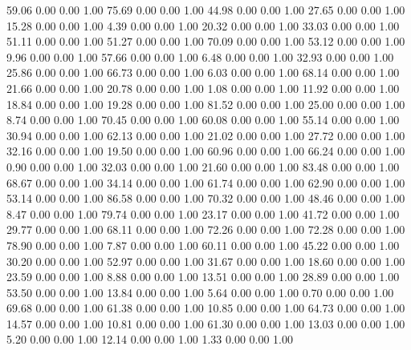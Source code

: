    59.06   0.00   0.00   1.00
   75.69   0.00   0.00   1.00
   44.98   0.00   0.00   1.00
   27.65   0.00   0.00   1.00
   15.28   0.00   0.00   1.00
    4.39   0.00   0.00   1.00
   20.32   0.00   0.00   1.00
   33.03   0.00   0.00   1.00
   51.11   0.00   0.00   1.00
   51.27   0.00   0.00   1.00
   70.09   0.00   0.00   1.00
   53.12   0.00   0.00   1.00
    9.96   0.00   0.00   1.00
   57.66   0.00   0.00   1.00
    6.48   0.00   0.00   1.00
   32.93   0.00   0.00   1.00
   25.86   0.00   0.00   1.00
   66.73   0.00   0.00   1.00
    6.03   0.00   0.00   1.00
   68.14   0.00   0.00   1.00
   21.66   0.00   0.00   1.00
   20.78   0.00   0.00   1.00
    1.08   0.00   0.00   1.00
   11.92   0.00   0.00   1.00
   18.84   0.00   0.00   1.00
   19.28   0.00   0.00   1.00
   81.52   0.00   0.00   1.00
   25.00   0.00   0.00   1.00
    8.74   0.00   0.00   1.00
   70.45   0.00   0.00   1.00
   60.08   0.00   0.00   1.00
   55.14   0.00   0.00   1.00
   30.94   0.00   0.00   1.00
   62.13   0.00   0.00   1.00
   21.02   0.00   0.00   1.00
   27.72   0.00   0.00   1.00
   32.16   0.00   0.00   1.00
   19.50   0.00   0.00   1.00
   60.96   0.00   0.00   1.00
   66.24   0.00   0.00   1.00
    0.90   0.00   0.00   1.00
   32.03   0.00   0.00   1.00
   21.60   0.00   0.00   1.00
   83.48   0.00   0.00   1.00
   68.67   0.00   0.00   1.00
   34.14   0.00   0.00   1.00
   61.74   0.00   0.00   1.00
   62.90   0.00   0.00   1.00
   53.14   0.00   0.00   1.00
   86.58   0.00   0.00   1.00
   70.32   0.00   0.00   1.00
   48.46   0.00   0.00   1.00
    8.47   0.00   0.00   1.00
   79.74   0.00   0.00   1.00
   23.17   0.00   0.00   1.00
   41.72   0.00   0.00   1.00
   29.77   0.00   0.00   1.00
   68.11   0.00   0.00   1.00
   72.26   0.00   0.00   1.00
   72.28   0.00   0.00   1.00
   78.90   0.00   0.00   1.00
    7.87   0.00   0.00   1.00
   60.11   0.00   0.00   1.00
   45.22   0.00   0.00   1.00
   30.20   0.00   0.00   1.00
   52.97   0.00   0.00   1.00
   31.67   0.00   0.00   1.00
   18.60   0.00   0.00   1.00
   23.59   0.00   0.00   1.00
    8.88   0.00   0.00   1.00
   13.51   0.00   0.00   1.00
   28.89   0.00   0.00   1.00
   53.50   0.00   0.00   1.00
   13.84   0.00   0.00   1.00
    5.64   0.00   0.00   1.00
    0.70   0.00   0.00   1.00
   69.68   0.00   0.00   1.00
   61.38   0.00   0.00   1.00
   10.85   0.00   0.00   1.00
   64.73   0.00   0.00   1.00
   14.57   0.00   0.00   1.00
   10.81   0.00   0.00   1.00
   61.30   0.00   0.00   1.00
   13.03   0.00   0.00   1.00
    5.20   0.00   0.00   1.00
   12.14   0.00   0.00   1.00
    1.33   0.00   0.00   1.00
